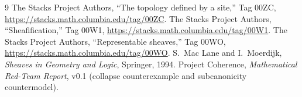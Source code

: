 \documentclass[11pt]{amsart}
\theoremstyle{definition}
\theoremstyle{remark}
\begin{document}
\begin{thebibliography}{9}
 The Stacks Project Authors, ``The topology defined by a site,'' Tag 00ZC, \url{https://stacks.math.columbia.edu/tag/00ZC}.
 The Stacks Project Authors, ``Sheafification,'' Tag 00W1, \url{https://stacks.math.columbia.edu/tag/00W1}.
 The Stacks Project Authors, ``Representable sheaves,'' Tag 00WO, \url{https://stacks.math.columbia.edu/tag/00WO}.
 S.~Mac Lane and I.~Moerdijk, \emph{Sheaves in Geometry and Logic}, Springer, 1994.
 Project Coherence, \emph{Mathematical Red-Team Report}, v0.1 (collapse counterexample and subcanonicity countermodel).
\end{thebibliography}
\end{document}
